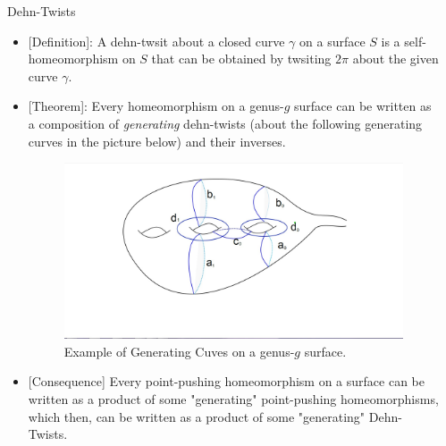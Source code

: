 \documentclass[leqno,presentation]{beamer}
\begin{document}
\begin{frame}
\begin{columns}[t]
\begin{column}{.45\linewidth}
\end{column}




\begin{column}{.25\linewidth}

\begin{block}{Dehn-Twists}
	\vspace{1ex}
	\begin{itemize}
		\item {[Definition]}: A dehn-twsit about a closed curve $\gamma$ on a surface $S$ is a self-homeomorphism on $S$ that can be obtained by twsiting $2\pi$ about the given curve $\gamma$.

		\item {[Theorem]}: Every homeomorphism on a genus-$g$ surface can be written as a composition of \textit{generating} dehn-twists (about the following generating curves in the picture below) and their inverses.
		\vspace{1ex}
		\begin{figure}[h]
			\begin{center}
				\includegraphics[width=11in]{Ex_Dehn-Twist_Generating_Curves.jpg}
				\caption{Example of Generating Cuves on a genus-$g$ surface.}
			\end{center}
		\end{figure}
		\item {[Consequence]} Every point-pushing homeomorphism on a surface can be written as a product of some "generating" point-pushing homeomorphisms, which then, can be written as a product of some "generating" Dehn-Twists.
	\end{itemize}
\end{block}


\end{column}
\end{columns}
\end{frame}
\end{document}
